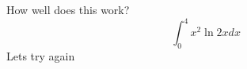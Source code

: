 \documentclass{article}
\begin{document}
How well does this work?
$$\int_0^4 x^2 \ln{2x}dx$$
Lets try again 
\end{document}
